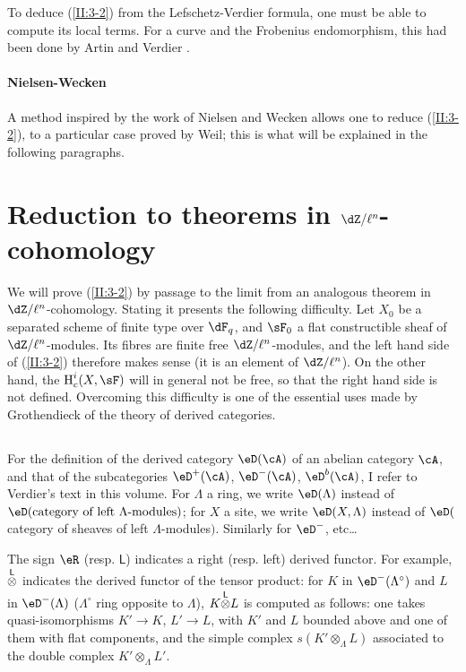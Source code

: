 To deduce (\ref{II:3-2}) from the Lefschetz-Verdier formula, one must
be able to compute its local terms. For a curve and the
Frobenius endomorphism, this had been done by Artin and Verdier \cite{ve67}.


\paragraph{Nielsen-Wecken}
A method inspired by the work of Nielsen and Wecken allows one to reduce
(\ref{II:3-2}), to a particular case proved by Weil; this is what will be
explained in the following paragraphs.










\section{Reduction to theorems in \texorpdfstring{$\dZ/\ell^n$}{Z/l n}-cohomology}\label{II:4}

We will prove (\ref{II:3-2}) by passage to the limit from an
analogous theorem in $\dZ/\ell^n$-cohomology. Stating it presents the
following difficulty. Let $X_0$ be a separated scheme of finite type over
$\dF_q$, and $\sF_0$ a flat constructible sheaf of $\dZ/\ell^n$-modules.
Its fibres are finite free $\dZ/\ell^n$-modules, and the left hand
side of (\ref{II:3-2}) therefore makes sense (it is an element of $\dZ/\ell^n$).
On the other hand, the $\h_c^i(X,\sF)$ will in general not be free, so that
the right hand side is not defined. Overcoming this difficulty is
one of the essential uses made by Grothendieck of the theory of
derived categories.




\subsection{}\label{II:4-1}

For the definition of the derived category $\eD(\cA)$ of an
abelian category $\cA$, and that of the subcategories $\eD^+(\cA)$, $\eD^-(\cA)$,
$\eD^b(\cA)$, I refer to Verdier's text in this volume. For $\Lambda$
a ring, we write $\eD(\Lambda)$ instead of
$\eD(\text{category of left $\Lambda$-modules})$; for $X$ a site, we
write $\eD(X,\Lambda)$ instead of
$\eD($category of sheaves of left $\Lambda$-modules$)$. Similarly
for $\eD^-$, etc\ldots

The sign $\eR$ (resp. $\mathsf{L}$) indicates a right (resp.
left) derived functor. For example, ${\overset{\mathsf{L}}{\otimes}}$ indicates the derived functor of the tensor
product: for $K$ in $\eD^-(\Lambda^\circ)$ and $L$ in $\eD^-(\Lambda)$
($\Lambda^\circ$ ring opposite to $\Lambda$), $K{\overset{\mathsf{L}}{\otimes}} L$ is computed
as follows: one takes quasi-isomorphisms $K'\to K$, $L'\to L$, with
$K'$ and $L$ bounded above and one of them with flat components, and
the simple complex $s(K'\otimes_\Lambda L)$ associated to the double complex
$K'\otimes_\Lambda L'$.





